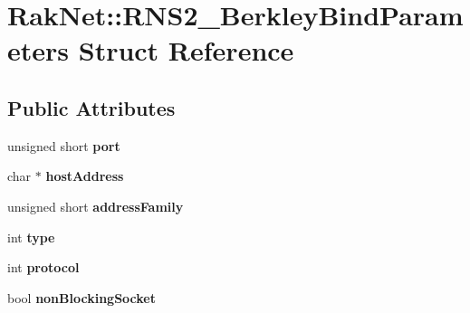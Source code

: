 \hypertarget{struct_rak_net_1_1_r_n_s2___berkley_bind_parameters}{\section{Rak\-Net\-:\-:R\-N\-S2\-\_\-\-Berkley\-Bind\-Parameters Struct Reference}
\label{struct_rak_net_1_1_r_n_s2___berkley_bind_parameters}
}
\subsection*{Public Attributes}
\begin{DoxyCompactItemize}
\item 
\hypertarget{struct_rak_net_1_1_r_n_s2___berkley_bind_parameters_addf9cd80b2d4f25ac1c9d4811adb0c02}{unsigned short {\bfseries port}}\label{struct_rak_net_1_1_r_n_s2___berkley_bind_parameters_addf9cd80b2d4f25ac1c9d4811adb0c02}

\item 
\hypertarget{struct_rak_net_1_1_r_n_s2___berkley_bind_parameters_a885c644d34c19a0bf3623401bd7dc371}{char $\ast$ {\bfseries host\-Address}}\label{struct_rak_net_1_1_r_n_s2___berkley_bind_parameters_a885c644d34c19a0bf3623401bd7dc371}

\item 
\hypertarget{struct_rak_net_1_1_r_n_s2___berkley_bind_parameters_adb145dadf574ddacaa9a3542d8a29621}{unsigned short {\bfseries address\-Family}}\label{struct_rak_net_1_1_r_n_s2___berkley_bind_parameters_adb145dadf574ddacaa9a3542d8a29621}

\item 
\hypertarget{struct_rak_net_1_1_r_n_s2___berkley_bind_parameters_aa752bd35881cbd9048b7f34ca5926a23}{int {\bfseries type}}\label{struct_rak_net_1_1_r_n_s2___berkley_bind_parameters_aa752bd35881cbd9048b7f34ca5926a23}

\item 
\hypertarget{struct_rak_net_1_1_r_n_s2___berkley_bind_parameters_acd84ad9a3e803f5e1d408c6fd4b0ba76}{int {\bfseries protocol}}\label{struct_rak_net_1_1_r_n_s2___berkley_bind_parameters_acd84ad9a3e803f5e1d408c6fd4b0ba76}

\item 
\hypertarget{struct_rak_net_1_1_r_n_s2___berkley_bind_parameters_a4a99918524140d49d2131f36e72c9d98}{bool {\bfseries non\-Blocking\-Socket}}\label{struct_rak_net_1_1_r_n_s2___berkley_bind_parameters_a4a99918524140d49d2131f36e72c9d98}


\end{DoxyCompactItemize}
